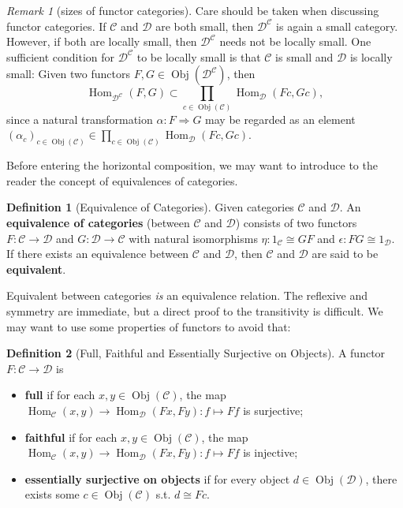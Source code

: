 \documentclass{article}
\theoremstyle{definition}
\newtheorem{definition}{Definition}[section]
\theoremstyle{definition}
\theoremstyle{remark}
\newtheorem*{remark}{Remark}
\DeclareMathOperator{\Obj}{Obj}
\DeclareMathOperator{\Hom}{Hom}
\begin{document}
	\begin{remark}[sizes of functor categories]
	Care should be taken when discussing functor categories. If $\mathcal{C}$ and $\mathcal{D}$ are both small, then $\mathcal{D}^\mathcal{C}$ is again a small category. However, if both are locally small, then $\mathcal{D}^\mathcal{C}$ needs not be locally small. One sufficient condition for $\mathcal{D}^\mathcal{C}$ to be locally small is that $\mathcal{C}$ is small and $\mathcal{D}$ is locally small: Given two functors $F,G\in\Obj(\mathcal{D}^\mathcal{C})$, then
	\[\Hom_{\mathcal{D}^\mathcal{C}}(F,G)\subset \prod_{c\in\Obj(\mathcal{C})}\Hom_\mathcal{D}(Fc,Gc),\]
	since a natural transformation $\alpha:F\Rightarrow G$ may be regarded as an element $(\alpha_c)_{c\in\Obj(\mathcal{C})}\in\prod_{c\in\Obj(\mathcal{C})}\Hom_\mathcal{D}(Fc,Gc)$.
	\end{remark}
	Before entering the horizontal composition, we may want to introduce to the reader the concept of equivalences of categories. 
	\begin{definition}[Equivalence of Categories]
	Given categories $\mathcal{C}$ and $\mathcal{D}$. An \textbf{equivalence of categories} (between $\mathcal{C}$ and $\mathcal{D}$) consists of two functors $F:\mathcal{C}\to\mathcal{D}$ and $G:\mathcal{D}\to\mathcal{C}$ with natural isomorphisms $\eta:1_\mathcal{C}\cong GF$ and $\epsilon:FG\cong 1_\mathcal{D}$. If there exists an equivalence between $\mathcal{C}$ and $\mathcal{D}$, then $\mathcal{C}$ and $\mathcal{D}$ are said to be \textbf{equivalent}. 
	\end{definition}
	Equivalent between categories \textsl{is} an equivalence relation. The reflexive and symmetry are immediate, but a direct proof to the transitivity is difficult. We may want to use some properties of functors to avoid that:
	\begin{definition}[Full, Faithful and Essentially Surjective on Objects]
	A functor $F:\mathcal{C}\to \mathcal{D}$ is
		\begin{itemize}
			\item \textbf{full} if for each $x,y\in\Obj(\mathcal{C})$, the map $\Hom_\mathcal{C}(x,y)\to\Hom_\mathcal{D}(Fx,Fy):f\mapsto Ff$ is surjective;
			\item \textbf{faithful} if for each $x,y\in\Obj(\mathcal{C})$, the map $\Hom_\mathcal{C}(x,y)\to\Hom_\mathcal{D}(Fx,Fy):f\mapsto Ff$ is injective;
			\item \textbf{essentially surjective on objects} if for every object $d\in\Obj(\mathcal{D})$, there exists some $c\in\Obj(\mathcal{C})$ s.t. $d\cong Fc$.
		\end{itemize}
	\end{definition}
\end{document}
